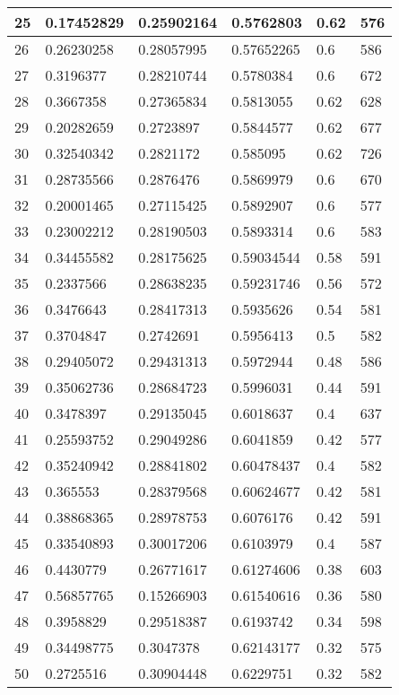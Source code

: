 \begin{longtable}{|l|l|l|l|l|l|}
25 & 0.17452829 & 0.25902164 & 0.5762803 & 0.62 & 576 \\ \hline 
26 & 0.26230258 & 0.28057995 & 0.57652265 & 0.6 & 586 \\ \hline 
27 & 0.3196377 & 0.28210744 & 0.5780384 & 0.6 & 672 \\ \hline 
28 & 0.3667358 & 0.27365834 & 0.5813055 & 0.62 & 628 \\ \hline 
29 & 0.20282659 & 0.2723897 & 0.5844577 & 0.62 & 677 \\ \hline 
30 & 0.32540342 & 0.2821172 & 0.585095 & 0.62 & 726 \\ \hline 
31 & 0.28735566 & 0.2876476 & 0.5869979 & 0.6 & 670 \\ \hline 
32 & 0.20001465 & 0.27115425 & 0.5892907 & 0.6 & 577 \\ \hline 
33 & 0.23002212 & 0.28190503 & 0.5893314 & 0.6 & 583 \\ \hline 
34 & 0.34455582 & 0.28175625 & 0.59034544 & 0.58 & 591 \\ \hline 
35 & 0.2337566 & 0.28638235 & 0.59231746 & 0.56 & 572 \\ \hline 
36 & 0.3476643 & 0.28417313 & 0.5935626 & 0.54 & 581 \\ \hline 
37 & 0.3704847 & 0.2742691 & 0.5956413 & 0.5 & 582 \\ \hline 
38 & 0.29405072 & 0.29431313 & 0.5972944 & 0.48 & 586 \\ \hline 
39 & 0.35062736 & 0.28684723 & 0.5996031 & 0.44 & 591 \\ \hline 
40 & 0.3478397 & 0.29135045 & 0.6018637 & 0.4 & 637 \\ \hline 
41 & 0.25593752 & 0.29049286 & 0.6041859 & 0.42 & 577 \\ \hline 
42 & 0.35240942 & 0.28841802 & 0.60478437 & 0.4 & 582 \\ \hline 
43 & 0.365553 & 0.28379568 & 0.60624677 & 0.42 & 581 \\ \hline 
44 & 0.38868365 & 0.28978753 & 0.6076176 & 0.42 & 591 \\ \hline 
45 & 0.33540893 & 0.30017206 & 0.6103979 & 0.4 & 587 \\ \hline 
46 & 0.4430779 & 0.26771617 & 0.61274606 & 0.38 & 603 \\ \hline 
47 & 0.56857765 & 0.15266903 & 0.61540616 & 0.36 & 580 \\ \hline 
48 & 0.3958829 & 0.29518387 & 0.6193742 & 0.34 & 598 \\ \hline 
49 & 0.34498775 & 0.3047378 & 0.62143177 & 0.32 & 575 \\ \hline 
50 & 0.2725516 & 0.30904448 & 0.6229751 & 0.32 & 582 \\ \hline 
\end{longtable}